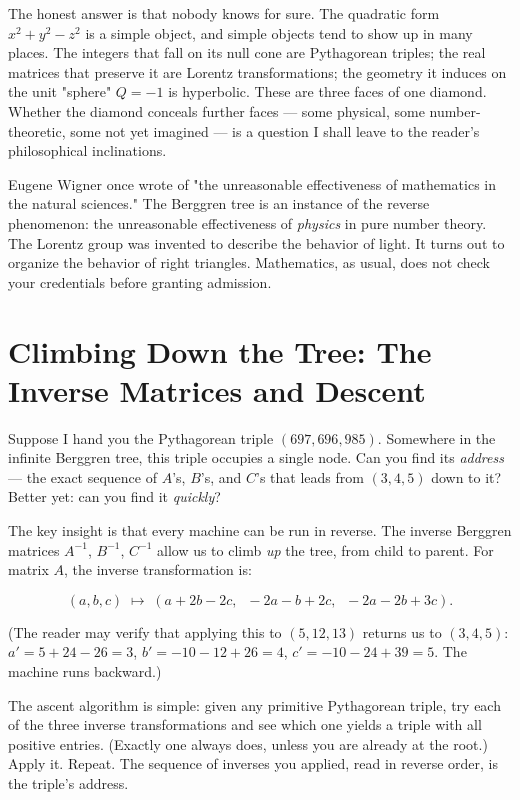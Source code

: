 The honest answer is that nobody knows for sure. The quadratic form $x^2 + y^2 - z^2$ is a simple object, and simple objects tend to show up in many places. The integers that fall on its null cone are Pythagorean triples; the real matrices that preserve it are Lorentz transformations; the geometry it induces on the unit "sphere" $Q = -1$ is hyperbolic. These are three faces of one diamond. Whether the diamond conceals further faces --- some physical, some number-theoretic, some not yet imagined --- is a question I shall leave to the reader's philosophical inclinations.

Eugene Wigner once wrote of "the unreasonable effectiveness of mathematics in the natural sciences." The Berggren tree is an instance of the reverse phenomenon: the unreasonable effectiveness of \textit{physics} in pure number theory. The Lorentz group was invented to describe the behavior of light. It turns out to organize the behavior of right triangles. Mathematics, as usual, does not check your credentials before granting admission.

\bigskip

\section*{Climbing Down the Tree: The Inverse Matrices and Descent}

Suppose I hand you the Pythagorean triple $(697, 696, 985)$. Somewhere in the infinite Berggren tree, this triple occupies a single node. Can you find its \textit{address} --- the exact sequence of $A$'s, $B$'s, and $C$'s that leads from $(3, 4, 5)$ down to it? Better yet: can you find it \textit{quickly}?

The key insight is that every machine can be run in reverse. The inverse Berggren matrices $A^{-1}$, $B^{-1}$, $C^{-1}$ allow us to climb \textit{up} the tree, from child to parent. For matrix $A$, the inverse transformation is:

\[
(a, b, c) \;\longmapsto\; (a + 2b - 2c,\;\; -2a - b + 2c,\;\; -2a - 2b + 3c).
\]

(The reader may verify that applying this to $(5, 12, 13)$ returns us to $(3, 4, 5)$: $a' = 5 + 24 - 26 = 3$, $b' = -10 - 12 + 26 = 4$, $c' = -10 - 24 + 39 = 5$. The machine runs backward.)

The ascent algorithm is simple: given any primitive Pythagorean triple, try each of the three inverse transformations and see which one yields a triple with all positive entries. (Exactly one always does, unless you are already at the root.) Apply it. Repeat. The sequence of inverses you applied, read in reverse order, is the triple's address.

